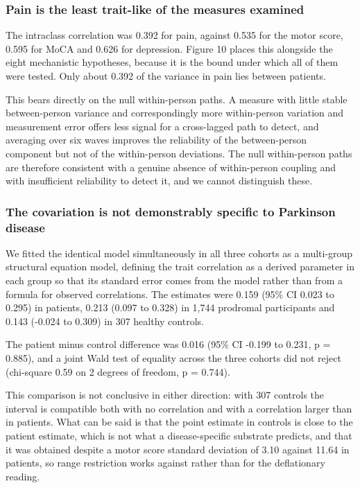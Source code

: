 \documentclass[
  english,
  12pt,
]{article}
\begin{document}
\subsubsection{Pain is the least trait-like of the measures examined}\label{pain-is-the-least-trait-like-of-the-measures-examined}

The intraclass correlation was 0.392 for pain, against 0.535 for the motor score, 0.595 for MoCA and 0.626 for depression. Figure 10 places this alongside the eight mechanistic hypotheses, because it is the bound under which all of them were tested. Only about 0.392 of the variance in pain lies between patients.

This bears directly on the null within-person paths. A measure with little stable between-person variance and correspondingly more within-person variation and measurement error offers less signal for a cross-lagged path to detect, and averaging over six waves improves the reliability of the between-person component but not of the within-person deviations. The null within-person paths are therefore consistent with a genuine absence of within-person coupling and with insufficient reliability to detect it, and we cannot distinguish these.

\subsubsection{The covariation is not demonstrably specific to Parkinson disease}\label{the-covariation-is-not-demonstrably-specific-to-parkinson-disease}

We fitted the identical model simultaneously in all three cohorts as a multi-group structural equation model, defining the trait correlation as a derived parameter in each group so that its standard error comes from the model rather than from a formula for observed correlations. The estimates were 0.159 (95\% CI 0.023 to 0.295) in patients, 0.213 (0.097 to 0.328) in 1,744 prodromal participants and 0.143 (-0.024 to 0.309) in 307 healthy controls.

The patient minus control difference was 0.016 (95\% CI -0.199 to 0.231, p = 0.885), and a joint Wald test of equality across the three cohorts did not reject (chi-square 0.59 on 2 degrees of freedom, p = 0.744).

This comparison is not conclusive in either direction: with 307 controls the interval is compatible both with no correlation and with a correlation larger than in patients. What can be said is that the point estimate in controls is close to the patient estimate, which is not what a disease-specific substrate predicts, and that it was obtained despite a motor score standard deviation of 3.10 against 11.64 in patients, so range restriction works against rather than for the deflationary reading.
\end{document}
